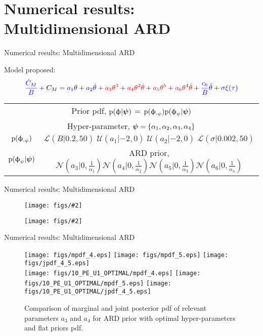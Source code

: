 \documentclass[xcolor=dvipsnames,10pt]{beamer}
\newcommand{\df}{\displaystyle\frac}
\newcommand{\U}{\mathcal{U}}
\def\bpsi{\mbox{\boldmath $\psi$}}
\newcommand{\cL}{\mathcal{L}}
\newcommand{\N}{\mathcal{N}}
\def\th{\ensuremath{\theta}}
\def\dth{\ensuremath{\dot{\theta}}}
\def\ddth{\ensuremath{\ddot{\theta}}}
\def\prob{\mbox{$\text{p}$}}
\def\bphi{\mbox{\ensuremath{\upphi}}}
\newlength{\figwidthb}
\newcommand{\beq}{\begin{equation}}
\newcommand{\eeq}{\end{equation}}
\def\bphik{\ensuremath{\bphi_{\text{-}\psi}}}
\def\bphiu{\ensuremath{\bphi_{\psi}}}
\def\Cm{\ensuremath{\text{C}_{m}(\th)}}
\def\dCm{\mbox{$\dot{C}_{M}$}}
\def\Cm{\ensuremath{C_{M}}}
\newcommand{\newfigure}[2]{\begin{figure}\centering 
\texttt{[image: figs/\#2]}\end{figure}\vspace{-0.2in}}
\newcommand{\alertb}[1]{\begin{center}\alert{#1}\end{center}}
\newcommand{\red}[1]{{\textcolor{red}{#1}}}
\newcommand{\blue}[1]{{\textcolor{blue}{#1}}}
\newcommand{\newblockb}[2]{\begin{block}{#1} \small #2 \end{block}}
\begin{document}
\section{Numerical results: Multidimensional ARD}
\begin{frame}{Numerical results: Multidimensional ARD}

\newblockb{Model proposed:}{
\beq \label{eq:mdODE}
\blue{\df{\dCm}{B}} + \Cm = \blue{a_1 \th} + \blue{a_2 \dth} + \red{a_3 \th^3} + \red{a_4 \th^2 \dth} +  \red{a_5 \th^5} +  \red{a_6 \th^4 \dth}  + \blue{\df{c_6}{B} \ddth}  + \blue{\sigma \xi(\tau)}
\eeq}
{
\renewcommand{\arraystretch}{2.0}
\begin{table}[!htbp]
\small
\centering
\begin{tabular}{|c||c|}
\hline
\multicolumn{2}{|c|}{Prior pdf, $\prob(\bphi|\bpsi)$ = $\prob(\bphik)\prob(\bphiu|\bpsi)$} \\
\multicolumn{2}{|c|}{Hyper-parameter, $\bpsi = \{\alpha_1, \alpha_2, \alpha_3, \alpha_4\}$ } \\ \hline
\blue{$\prob(\bphik)$} &  $ \cL(B|0.2, 50) \; \U(a_1| {-2},0) \; \U(a_2| {-2},0) \; \cL(\sigma |0.002,50) $  \\
\red{$\prob(\bphiu|\bpsi)$} & ARD prior, $\N\left(a_3|0,\frac{1}{\alpha_1}\right)\N\left(a_4|0,\frac{1}{\alpha_2}\right)\N\left(a_5|0,\frac{1}{\alpha_3}\right)\N\left(a_6|0,\frac{1}{\alpha_4}\right)$   \\ \hline 
\end{tabular}
\label{tab:t3}
\end{table}
}
\end{frame}



\begin{frame}{Numerical results: Multidimensional ARD}
\newfigure{0.85}{fig_04.eps}
\newfigure{0.65}{fig_01.eps}
\end{frame}



\begin{frame}{Numerical results: Multidimensional ARD}
\begin{figure}[!htbp]
\centering
\texttt{[image: figs/mpdf\_4.eps]}
\texttt{[image: figs/mpdf\_5.eps]}
\texttt{[image: figs/jpdf\_4\_5.eps]}\\
\texttt{[image: figs/10\_PE\_U1\_OPTIMAL/mpdf\_4.eps]}
\texttt{[image: figs/10\_PE\_U1\_OPTIMAL/mpdf\_5.eps]}
\texttt{[image: figs/10\_PE\_U1\_OPTIMAL/jpdf\_4\_5.eps]}
\caption{Comparison of marginal and joint posterior pdf of relevant parameters $a_3$ and $a_4$ for ARD prior with optimal hyper-parameters and flat priors pdf. }
\label{fig:md3}
\end{figure}
\end{frame}
\end{document}

